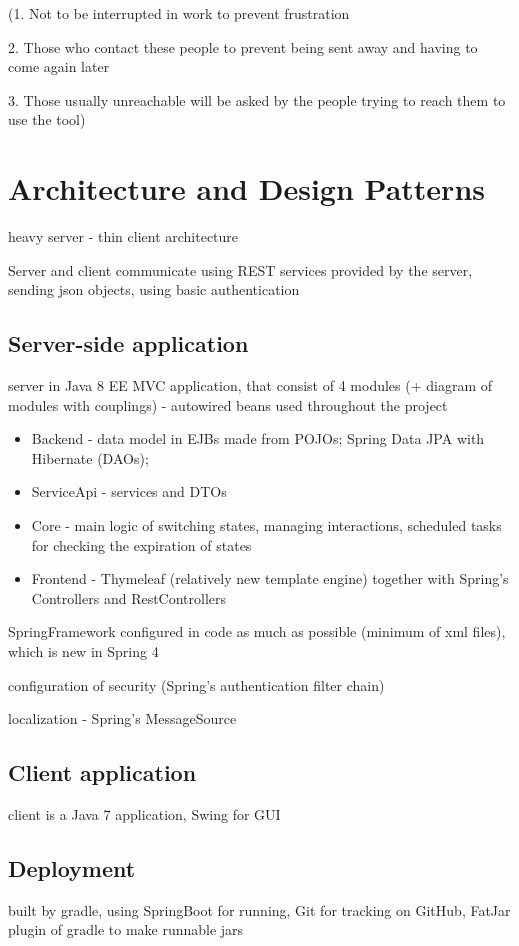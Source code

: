 \documentclass[11pt,singleside]{myfithesis2}
\begin{document}
(1. Not to be interrupted in work to prevent frustration

2. Those who contact these people to prevent being sent away and having to come again later

3. Those usually unreachable will be asked by the people trying to reach them to use the tool)

	
	\section{Architecture and Design Patterns}
heavy server - thin client architecture

Server and client communicate using REST services provided by the server, sending json objects, using basic authentication


		\subsection{Server-side application}
server in Java 8 EE MVC application, that consist of 4 modules (+ diagram of modules with couplings) - autowired beans used throughout the project

\begin{itemize}
	\item Backend - data model in EJBs made from POJOs; Spring Data JPA with Hibernate (DAOs);
	\item ServiceApi - services and DTOs
	\item Core - main logic of switching states, managing interactions, scheduled tasks for checking the expiration of states
	\item Frontend - Thymeleaf (relatively new template engine) together with Spring's Controllers and RestControllers
\end{itemize}

SpringFramework configured in code as much as possible (minimum of xml files), which is new in Spring 4 

configuration of security (Spring's authentication filter chain)

localization - Spring's MessageSource

		\subsection{Client application}
client is a Java 7 application, Swing for GUI


		\subsection{Deployment}
built by gradle, using SpringBoot for running, Git for tracking on GitHub, FatJar plugin of gradle to make runnable jars
\end{document}
